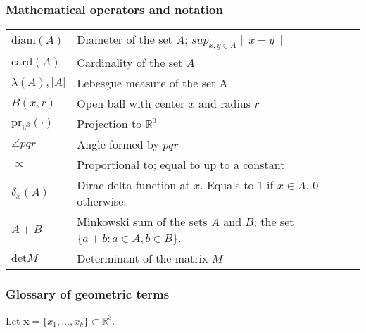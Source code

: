 \documentclass[12pt,a4paper]{report}
\newcommand{\Rt}{{\mathbb R^3}}
\theoremstyle{definition}
\theoremstyle{remark}
\theoremstyle{theorem}
\theoremstyle{remark}
\newcommand{\x}{{\mathbf{x}}}
\begin{document}


\tableofcontents



\subsubsection{Mathematical operators and notation}
\begin{tabular}{ l l }
	$\mathrm{diam}(A)$ & Diameter of the set $A$; $sup_{x,y\in A}\|x-y\|$ \\
	$\mathrm{card}(A)$ & Cardinality of the set $A$ \\
	$\lambda(A), |A|$ & Lebesgue measure of the set A \\
	$B(x,r)$ & Open ball with center $x$ and radius $r$ \\
	$\mathrm{pr}_{\Rt}(\cdot)$ & Projection to $\Rt$ \\
	$\angle pqr$ & Angle formed by $pqr$ \\
	$\propto$ & Proportional to; equal to up to a constant \\
	$\delta_x(A)$ & Dirac delta function at $x$. Equals to 1 if $x\in A$, 0 otherwise.\\ 
	$A+B$ & Minkowski sum of the sets $A$ and $B$; the set $\{a+b: a\in A, b\in B\}$. \\
	$\mathrm{det} M$ & Determinant of the matrix $M$ \\
\end{tabular}




\subsubsection{Glossary of geometric terms}
Let $\x = \{x_1,\dots, x_k\} \subset \Rt$.
\end{document}
